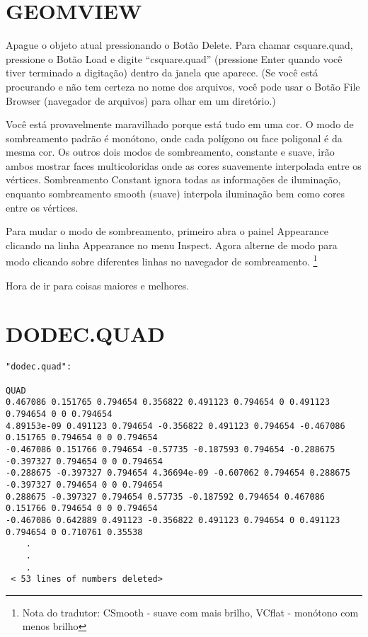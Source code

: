 \documentclass[12pt,a4paper]{book}
\begin{document}
\section{GEOMVIEW}

Apague o objeto atual pressionando o Bot\~ao Delete.  Para
chamar csquare.quad, pressione o Bot\~ao Load e digite ``csquare.quad'' (pressione
Enter quando voc\^e tiver terminado a digita\c{c}\~ao) dentro da janela que aparece. (Se
voc\^e est\'a procurando e n\~ao tem certeza no nome dos arquivos, voc\^e pode usar o
Bot\~ao File Browser (navegador de arquivos) para olhar em um diret\'{o}rio.)

Voc\^e est\'a provavelmente maravilhado porque est\'a tudo em uma cor.  O modo de sombreamento
padr\~ao \'e mon\'{o}tono, onde cada pol\'igono ou face poligonal \'e da mesma
cor. Os outros dois modos de sombreamento, constante e suave, ir\~ao ambos
mostrar faces multicoloridas onde as cores suavemente interpolada
entre os v\'ertices. Sombreamento Constant ignora todas as informa\c{c}\~oes de ilumina\c{c}\~ao,
enquanto sombreamento smooth (suave) interpola ilumina\c{c}\~ao bem como cores entre
os v\'ertices.

Para mudar o modo de sombreamento, primeiro abra o painel Appearance clicando
na linha Appearance no menu Inspect.  Agora alterne de
modo para modo clicando sobre diferentes linhas no navegador de sombreamento.
\footnote{Nota do tradutor: CSmooth - suave com mais brilho, VCflat - mon\'{o}tono com menos brilho}

Hora de ir para coisas maiores e melhores. 

\section{DODEC.QUAD}

\tiny
\begin{verbatim}
"dodec.quad":

QUAD
0.467086 0.151765 0.794654 0.356822 0.491123 0.794654 0 0.491123 0.794654 0 0 0.794654
4.89153e-09 0.491123 0.794654 -0.356822 0.491123 0.794654 -0.467086 0.151765 0.794654 0 0 0.794654
-0.467086 0.151766 0.794654 -0.57735 -0.187593 0.794654 -0.288675 -0.397327 0.794654 0 0 0.794654
-0.288675 -0.397327 0.794654 4.36694e-09 -0.607062 0.794654 0.288675 -0.397327 0.794654 0 0 0.794654
0.288675 -0.397327 0.794654 0.57735 -0.187592 0.794654 0.467086 0.151766 0.794654 0 0 0.794654
-0.467086 0.642889 0.491123 -0.356822 0.491123 0.794654 0 0.491123 0.794654 0 0.710761 0.35538
	.
	.
	.
 < 53 lines of numbers deleted>
\end{verbatim}
\normalsize
\end{document}
